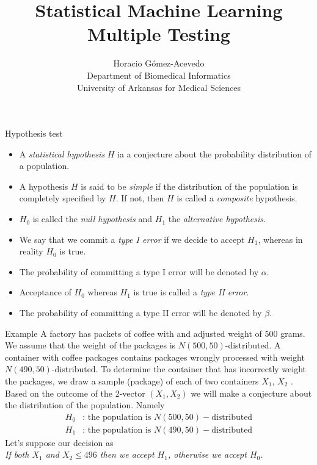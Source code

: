 \documentclass{beamer}
\title{Statistical Machine Learning\\ Multiple Testing}
\author{Horacio G\'omez-Acevedo\\ Department of Biomedical Informatics\\
	University of Arkansas for Medical Sciences}
\begin{document}
	\begin{frame}[plain]
		\maketitle
	\end{frame}
	
	\begin{frame}{Hypothesis test}
		\begin{itemize}
			\item A \textit{statistical hypothesis} $H$ ia a conjecture about the probability distribution of a population.
			\item A hypothesis $H$ is said to be \textit{simple} if the distribution of the population is completely specified by $H$. If not, then $H$ is called a \textit{composite} hypothesis.
			\item $H_0$ is called the \textit{null hypothesis} and $H_1$ the \textit{alternative hypothesis}.
			\item  We say that we commit a  \textit{type I error} if we decide to accept $H_1$, whereas in reality $H_0$ is true.
			\item  The probability of committing a type I error will be denoted by $\alpha$.
			\item Acceptance of $H_0$ whereas $H_1$ is true is called a \textit{type II error}. 
			\item  The probability of committing a type II error will be denoted by $\beta$.  
		\end{itemize}		

	\end{frame}

\begin{frame}{Example}
	A factory has packets of coffee with and adjusted weight of 500 grams. We assume that the weight of the packages is $N(500,50)$-distributed. A container with coffee packages contains packages wrongly processed with weight $N(490,50)$-distributed. To determine the container that has incorrectly weight the packages, we draw a sample (package) of each of two containers $X_1$, $X_2$ . Based on the outcome of the 2-vector $(X_1,X_2)$ we will make a conjecture about the distribution of the population. Namely
	\begin{equation*}
		\begin{split}
			H_0 & \text{: the population is } N(500,50)-\text{distributed}\\
			H_1 & \text{: the population is } N(490,50)-\text{distributed}
		\end{split}
	\end{equation*}
	Let's suppose our decision as\\
	\textit{If both $X_1$ and $X_2 \le 496$ then we accept $H_1$, otherwise we accept $H_0$. }
\end{frame}
\end{document}
